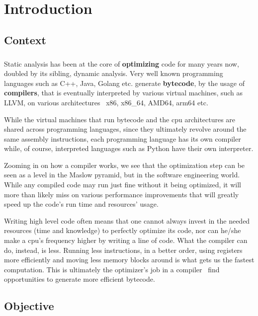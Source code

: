 \chapter{Introduction} 

\section{Context} 

\paragraph*{}
Static analysis has been at the core of \textbf{optimizing} code for many years now, doubled by its sibling, dynamic analysis. Very well known programming languages such as C++, Java, Golang etc. generate \textbf{bytecode}, by the usage of \textbf{compilers}, that is eventually interpreted by various virtual machines, such as LLVM, on various architectures \textemdash \ x86, x86\_64, AMD64, arm64 etc.

While the virtual machines that run bytecode and the cpu architectures are shared across programming languages, since they ultimately revolve around the same assembly instructions, each programming language has its own compiler while, of course, interpreted languages such as Python have their own interpreter.

Zooming in on how a compiler works, we see that the optimization step can be seen as a level in the Maslow pyramid, but in the software engineering world. While any compiled code may run just fine without it being optimized, it will more than likely miss on various performance improvements that will greatly speed up the code's run time and resources' usage.

Writing high level code often means that one cannot always invest in the needed resources (time and knowledge) to perfectly optimize its code, nor can he/she make a cpu's frequency higher by writing a line of code. What the compiler can do, instead, is less. Running less instructions, in a better order, using registers more efficiently and moving less memory blocks around is what gets us the fastest computation. This is ultimately the optimizer's job in a compiler \textemdash \ find opportunities to generate more efficient bytecode.


\section{Objective}

